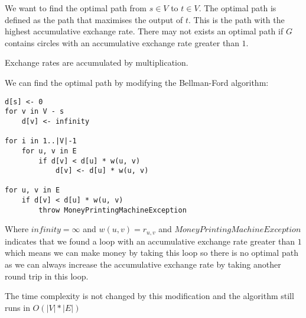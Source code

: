 \documentclass[12pt]{article}
\begin{document}
We want to find the optimal path from $s \in V$ to $t \in V$. The optimal path is defined as the path that maximises the output of $t$. This is the path with the highest accumulative exchange rate. There may not exists an optimal path if $G$ contains circles with an accumulative exchange rate greater than $1$.

Exchange rates are accumulated by multiplication.

We can find the optimal path by modifying the Bellman-Ford algorithm:

\begin{lstlisting}
d[s] <- 0
for v in V - s
	d[v] <- infinity

for i in 1..|V|-1
	for u, v in E
		if d[v] < d[u] * w(u, v)
			d[v] <- d[u] * w(u, v)

for u, v in E
	if d[v] < d[u] * w(u, v)
		throw MoneyPrintingMachineException
\end{lstlisting}

Where $infinity = \infty$ and $w(u, v) = r_{u, v}$ and $MoneyPrintingMachineException$ indicates that we found a loop with an accumulative exchange rate greater than $1$ which means we can make money by taking this loop so there is no optimal path as we can always increase the accumulative exchange rate by taking another round trip in this loop.

The time complexity is not changed by this modification and the algorithm still runs in $O(|V| * |E|)$

\section{} %
\end{document}
